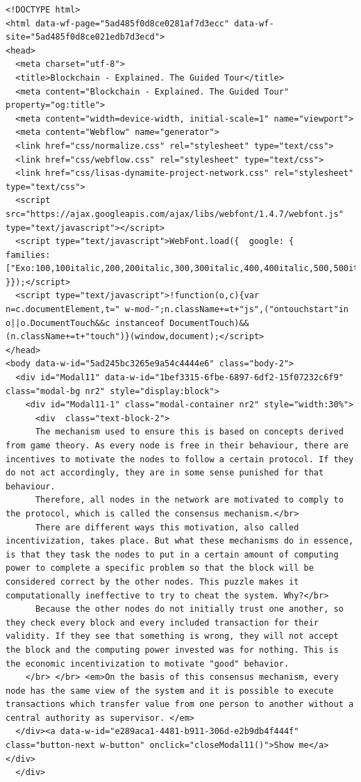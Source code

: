\begin{lstlisting}
<!DOCTYPE html>
<html data-wf-page="5ad485f0d8ce0281af7d3ecc" data-wf-site="5ad485f0d8ce021edb7d3ecd">
<head>
  <meta charset="utf-8">
  <title>Blockchain - Explained. The Guided Tour</title>
  <meta content="Blockchain - Explained. The Guided Tour" property="og:title">
  <meta content="width=device-width, initial-scale=1" name="viewport">
  <meta content="Webflow" name="generator">
  <link href="css/normalize.css" rel="stylesheet" type="text/css">
  <link href="css/webflow.css" rel="stylesheet" type="text/css">
  <link href="css/lisas-dynamite-project-network.css" rel="stylesheet" type="text/css">
  <script src="https://ajax.googleapis.com/ajax/libs/webfont/1.4.7/webfont.js" type="text/javascript"></script>
  <script type="text/javascript">WebFont.load({  google: {    families: ["Exo:100,100italic,200,200italic,300,300italic,400,400italic,500,500italic,600,600italic,700,700italic,800,800italic,900,900italic","Roboto:100,100italic,300,300italic,regular,italic,500,500italic,700,700italic,900,900italic"]  }});</script>
  <script type="text/javascript">!function(o,c){var n=c.documentElement,t=" w-mod-";n.className+=t+"js",("ontouchstart"in o||o.DocumentTouch&&c instanceof DocumentTouch)&&(n.className+=t+"touch")}(window,document);</script>
</head>
<body data-w-id="5ad245bc3265e9a54c4444e6" class="body-2">
  <div id="Modal11" data-w-id="1bef3315-6fbe-6897-6df2-15f07232c6f9" class="modal-bg nr2" style="display:block">
    <div id="Modal11-1" class="modal-container nr2" style="width:30%">
      <div  class="text-block-2">
      The mechanism used to ensure this is based on concepts derived from game theory. As every node is free in their behaviour, there are incentives to motivate the nodes to follow a certain protocol. If they do not act accordingly, they are in some sense punished for that behaviour.
      Therefore, all nodes in the network are motivated to comply to the protocol, which is called the consensus mechanism.</br>
      There are different ways this motivation, also called incentivization, takes place. But what these mechanisms do in essence, is that they task the nodes to put in a certain amount of computing power to complete a specific problem so that the block will be considered correct by the other nodes. This puzzle makes it computationally ineffective to try to cheat the system. Why?</br>
      Because the other nodes do not initially trust one another, so they check every block and every included transaction for their validity. If they see that something is wrong, they will not accept the block and the computing power invested was for nothing. This is the economic incentivization to motivate "good" behavior.
    </br> </br> <em>On the basis of this consensus mechanism, every node has the same view of the system and it is possible to execute transactions which transfer value from one person to another without a central authority as supervisor. </em>
  </div><a data-w-id="e289aca1-4481-b911-306d-e2b9db4f444f" class="button-next w-button" onclick="closeModal11()">Show me</a></div>
  </div>


\end{lstlisting}
